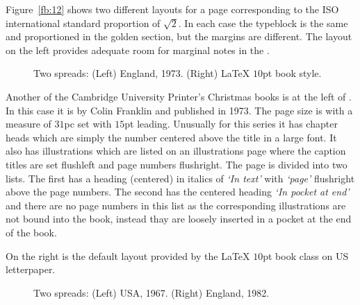 \documentclass[10pt,letterpaper,extrafontsizes]{memoir}
\newcommand\U[2]{\textrm{#1}\,\textrm{#2}}
\begin{document}
    Figure~\ref{fb:12} shows two different layouts for a page corresponding
to the ISO international standard proportion of $\sqrt{2}$. In each case
the typeblock is the same and proportioned in the 
golden section, but the margins are 
different. The layout on the left provides adequate
room for marginal notes in the \foredge.


\begin{figure}
\centering
\begin{minipage}[b]{\pwlayi}
\end{minipage}
\hfill
\begin{minipage}[b]{\pwlayi}
\end{minipage}
\caption[Two spreads: England, 1973 and LaTeX $\U{10}{pt}$ book style]%
        {Two spreads: (Left) England, 1973.
         (Right) LaTeX $10$pt book style.} \label{fb:13}
\end{figure}

Another of the Cambridge University Printer's Christmas books is at the left of
. In this case it is  by Colin Franklin and published in 1973. The
page size is  with a measure of $31$pc set with
$15$pt leading.  Unusually for this series it has chapter
heads which are simply the number centered above
the title in a large font. It also has
illustrations which are listed on an illustrations
page where the caption titles are set flushleft and
page numbers flushright. The page is divided into two lists. The first
has a heading (centered) in italics of \textit{`In text'} with
\textit{`page'} flushright above the page numbers.  The second has the
centered heading \textit{`In pocket at end'} and there are no page
numbers in this list as the corresponding illustrations are not bound
into the book, instead thay are loosely inserted in a pocket at the
end of the book.


On the right is the default layout provided by the
LaTeX $10$pt book class on US letterpaper.

\begin{figure}
\centering
\begin{minipage}[b]{\pwlayi}
\end{minipage}
\hfill
\begin{minipage}[b]{\pwlayi}
\end{minipage}
\caption[Two spreads: USA, 1967 and England, 1982]%
        {Two spreads: (Left) USA, 1967.
         (Right) England, 1982.} \label{fb:14}
\end{figure}
\end{document}
